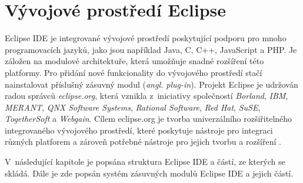 \chapter{Vývojové prostředí Eclipse}                                      %
\label{chapter:eclipse_ide}
Eclipse IDE je integrované vývojové prostředí poskytující podporu pro mnoho programovacích jazyků, jako jsou například Java, C, C++, JavaScript a PHP.  Je záložen na modulové architektuře, která umožňuje snadné rozšíření této platformy. Pro přidání nové funkcionality do vývojového prostředí stačí nainstalovat příslušný zásuvný modul (\emph{angl. plug-in}). Projekt Eclipse je udržován radou správců \emph{eclipse.org}, která vznikla z~iniciativy společností \emph{Borland}, \emph{IBM}, \emph{MERANT}, \emph{QNX Software Systems}, \emph{Rational Software}, \emph{Red Hat}, \emph{SuSE}, \emph{TogetherSoft} a \emph{Webgain}. Cílem eclipse.org je tvorba univerzálního rozšiřitelného integrovaného vývojového prostředí, které poskytuje nástroje pro integraci různých platforem a zároveň potřebné nástroje pro jejich tvorbu a rozšíření \cite{eclipse-org}.

V~následující kapitole je popsána struktura Eclipse IDE a částí, ze kterých se skládá. Dále je zde popsán systém zásuvných modulů Eclipse IDE a jejich částí.

